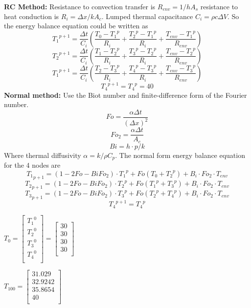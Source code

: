 \begin{solution}
\textbf{RC Method:} 
Resistance to convection  transfer is $R_{env}=1/hA_s$ resistance to heat conduction is
$R_i=\Delta x/kA_c$. Lumped thermal capacitance $C_i=\rho c\Delta V$.
So the energy balance equation could be written as
$$
{T_1}^{p+1}=\frac{\Delta t}{C_i}
\left(
\frac{{T_0}-{T_1}^p}{R_i}+
\frac{{T_2}^p-{T_1}^p}{R_i}+
\frac{T_{env}-{T_1}^p}{R_{env}}
\right)
$$
$$
{T_2}^{p+1}=\frac{\Delta t}{C_i}
\left(
\frac{{T_1}-{T_2}^p}{R_i}+
\frac{{T_3}^p-{T_2}^p}{R_i}+
\frac{T_{env}-{T_2}^p}{R_{env}}
\right)
$$
$$
{T_1}^{p+1}=\frac{\Delta t}{C_i}
\left(
\frac{{T_2}-{T_3}^p}{R_i}+
\frac{{T_4}^p-{T_3}^p}{R_i}+
\frac{T_{env}-{T_3}^p}{R_{env}}
\right)
$$
$${T_4}^{p+1}={T_4}^p=40$$
\textbf{Normal method:}
Use the Biot number and finite-difference form of the Fourier number.
$$Fo=\frac{\alpha\Delta t}{(\Delta x)^2}$$
$${Fo}_2=\frac{\alpha\Delta t}{A_c}$$
$$Bi=h\cdot p/k $$
Where thermal diffusivity $\alpha=k/\rho C_p$. The normal form energy balance
equation for the 4 nodes are
$$
{T_1}_{p+1}=(1-2Fo-Bi{Fo}_2)\cdot {T_1}^p+
Fo(T_0+{T_2}^p)+B_i\cdot {Fo}_2\cdot T_{env}
$$
$$
{T_2}_{p+1}=(1-2Fo-Bi{Fo}_2)\cdot {T_2}^p+
Fo({T_1}^p+{T_3}^p)+B_i\cdot {Fo}_2\cdot T_{env}
$$
$$
{T_3}_{p+1}=(1-2Fo-Bi{Fo}_2)\cdot {T_3}^p+
Fo({T_2}^p+{T_4}^p)+B_i\cdot {Fo}_2\cdot T_{env}
$$
$${T_4}^{p+1}={T_4}^p$$

$T_0= 
\begin{bmatrix}
{T_1}^0\\
{T_2}^0\\
{T_3}^0\\
{T_4}^0\\
\end{bmatrix}
=
\begin{bmatrix}
30\\
30\\
30\\
30\\
\end{bmatrix}
$

$T_{100}=
\begin{bmatrix}
31.029\\
32.9242\\
35.8654\\
40\\
\end{bmatrix}
$
\end{solution}


